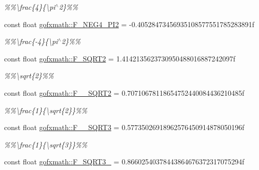 \begin{DoxyCompactItemize}
\begin{DoxyCompactList}\small\item\em \%\%\textbackslash{}frac\{4\}\{\textbackslash{}pi$^\wedge$2\}\%\% \end{DoxyCompactList}\item 
\hypertarget{group___scalar_math_consts_ga6ec302fb2e7b4cfb615300db5bc4f271}{}const float \hyperlink{group___scalar_math_consts_ga6ec302fb2e7b4cfb615300db5bc4f271}{gofxmath\+::\+F\+\_\+\+N\+E\+G4\+\_\+\+P\+I2} = -\/0.\+40528473456935108577551785283891f\label{group___scalar_math_consts_ga6ec302fb2e7b4cfb615300db5bc4f271}

\begin{DoxyCompactList}\small\item\em \%\%\textbackslash{}frac\{-\/4\}\{\textbackslash{}pi$^\wedge$2\}\%\% \end{DoxyCompactList}\item 
\hypertarget{group___scalar_math_consts_gad425f5da9daf66a4bf041bf10752f52f}{}const float \hyperlink{group___scalar_math_consts_gad425f5da9daf66a4bf041bf10752f52f}{gofxmath\+::\+F\+\_\+\+S\+Q\+R\+T2} = 1.\+4142135623730950488016887242097f\label{group___scalar_math_consts_gad425f5da9daf66a4bf041bf10752f52f}

\begin{DoxyCompactList}\small\item\em \%\%\textbackslash{}sqrt\{2\}\%\% \end{DoxyCompactList}\item 
\hypertarget{group___scalar_math_consts_gaf5e286a6a93e2ea1dc623acbcbcc8159}{}const float \hyperlink{group___scalar_math_consts_gaf5e286a6a93e2ea1dc623acbcbcc8159}{gofxmath\+::\+F\+\_\+\_\+\+S\+Q\+R\+T2} = 0.\+70710678118654752440084436210485f\label{group___scalar_math_consts_gaf5e286a6a93e2ea1dc623acbcbcc8159}

\begin{DoxyCompactList}\small\item\em \%\%\textbackslash{}frac\{1\}\{\textbackslash{}sqrt\{2\}\}\%\% \end{DoxyCompactList}\item 
\hypertarget{group___scalar_math_consts_gaeb8c2298593ed612e5ad6d69bfa0bcd6}{}const float \hyperlink{group___scalar_math_consts_gaeb8c2298593ed612e5ad6d69bfa0bcd6}{gofxmath\+::\+F\+\_\+\_\+\+S\+Q\+R\+T3} = 0.\+57735026918962576450914878050196f\label{group___scalar_math_consts_gaeb8c2298593ed612e5ad6d69bfa0bcd6}

\begin{DoxyCompactList}\small\item\em \%\%\textbackslash{}frac\{1\}\{\textbackslash{}sqrt\{3\}\}\%\% \end{DoxyCompactList}\item 
\hypertarget{group___scalar_math_consts_gaf63dd491939d577dc0d1d1f1989341bb}{}const float \hyperlink{group___scalar_math_consts_gaf63dd491939d577dc0d1d1f1989341bb}{gofxmath\+::\+F\+\_\+\+S\+Q\+R\+T3\+\_} = 0.\+86602540378443864676372317075294f\label{group___scalar_math_consts_gaf63dd491939d577dc0d1d1f1989341bb}


\end{DoxyCompactItemize}
